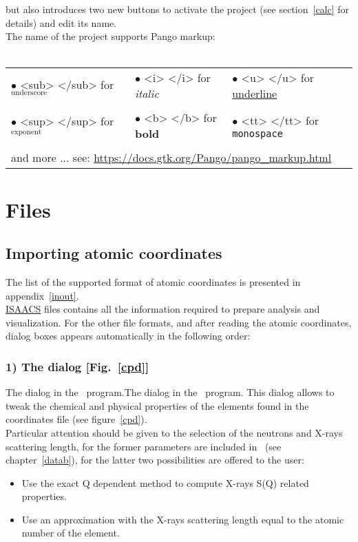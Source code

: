 but also introduces two new buttons to activate the project (see section~\ref{calc} for details) and edit its name.\\ 
\laf The name of the project supports Pango markup\cite{pangomarkup}: \\
\\
{\small{
\begin{tabular}{p{5cm}p{5cm}p{5cm}}
$\bullet$ <sub> </sub> for $_{\text{underscore}}$ & $\bullet$ <i> </i> for {\it{italic}} & $\bullet$ <u> </u> for {\uline{underline}} \\
\\
$\bullet$ <sup> </sup> for $^{\text{exponent}}$ & $\bullet$ <b> </b> for {\bf{bold}} & $\bullet$ <tt> </tt> for {\texttt{monospace}} \\
\\
\multicolumn{3}{l}{and more ... see: \href{https://docs.gtk.org/Pango/pango\_markup.html}{https://docs.gtk.org/Pango/pango\_markup.html}}
\end{tabular}
}}

\section{Files}

\subsection{Importing atomic coordinates}
\label{import}

The list of the supported format of atomic coordinates is presented in appendix~\ref{inout}. \\ 
\href{https://isaacs.sourceforge.net}{ISAACS} files contains all the information required to prepare analysis and visualization. 
For the other file formats, and after reading the atomic coordinates, dialog boxes appears automatically in the following order:
\subsubsection*{1) The  dialog [Fig.~\ref{cpd}]}
{The  dialog in the \atomes\ program.}{The  dialog in the \atomes\ program.}
This dialog allows to tweak the chemical and physical properties of the elements found in the coordinates file (see figure~\ref{cpd}). \\
Particular attention should be given to the selection of the neutrons and X-rays scattering length, 
for the former parameters are included in \atomes\ (see chapter~\ref{datab}), 
for the latter two possibilities are offered to the user:
\begin{itemize}
\item Use the exact Q dependent method to compute X-rays S(Q) related properties.
\item Use an approximation with the X-rays scattering length equal to the atomic number of the element.
\end{itemize}
